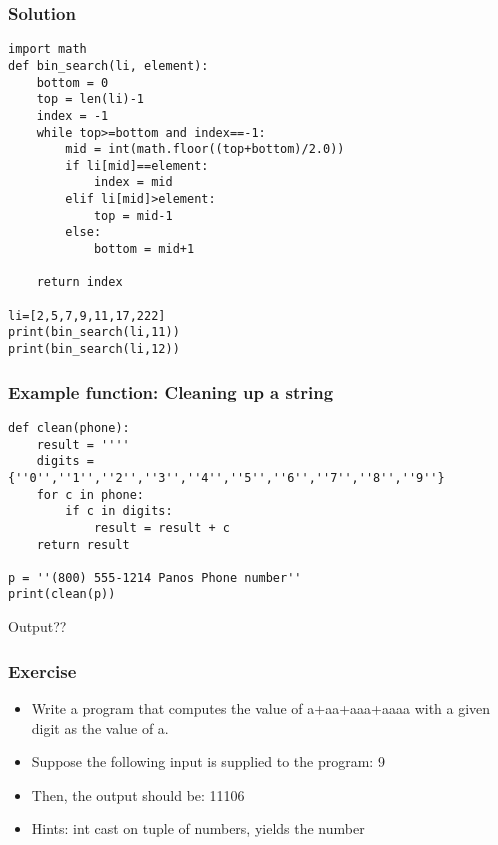 \begin{frame}[fragile]\frametitle{Solution}
\begin{lstlisting}
import math
def bin_search(li, element):
    bottom = 0
    top = len(li)-1
    index = -1
    while top>=bottom and index==-1:
        mid = int(math.floor((top+bottom)/2.0))
        if li[mid]==element:
            index = mid
        elif li[mid]>element:
            top = mid-1
        else:
            bottom = mid+1

    return index

li=[2,5,7,9,11,17,222]
print(bin_search(li,11))
print(bin_search(li,12))
\end{lstlisting}
\end{frame}

\begin{frame}[fragile]\frametitle{Example function: Cleaning up a string}
\begin{lstlisting}
def clean(phone):
    result = ''''
    digits = {''0'',''1'',''2'',''3'',''4'',''5'',''6'',''7'',''8'',''9''}
    for c in phone:
        if c in digits:
            result = result + c
    return result        
    
p = ''(800) 555-1214 Panos Phone number''
print(clean(p))
\end{lstlisting}
Output??
\end{frame}

%

\begin{frame}[fragile]\frametitle{Exercise}
  \begin{itemize}
  \item Write a program that computes the value of a+aa+aaa+aaaa with a given digit as the value of a.
  \item Suppose the following input is supplied to the program: 9
  \item Then, the output should be: 11106
  \item Hints: int cast on tuple of numbers, yields the number

  \end{itemize}  
\end{frame}

